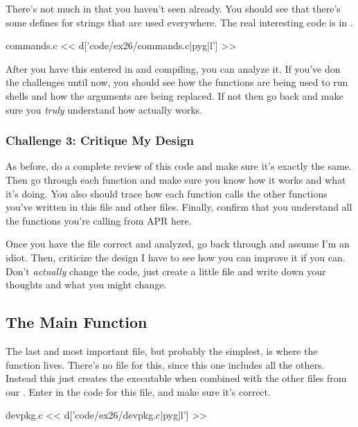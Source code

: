 There's not much in  that you haven't seen already.  You
should see that there's some defines for strings that are used everywhere.
The real interesting code is in .

\begin{code}{commands.c}
<< d['code/ex26/commands.c|pyg|l'] >>
\end{code}

After you have this entered in and compiling, you can analyze it.  If you've
don the challenges until now, you should see how the  functions
are being used to run shells and how the arguments are being replaced.  If
not then go back and make sure you \emph{truly} understand how 
actually works.

\subsubsection{Challenge 3: Critique My Design}

As before, do a complete review of this code and make sure it's exactly
the same.  Then go through each function and make sure you know how it 
works and what it's doing.  You also should trace how each function calls
the other functions you've written in this file and other files.  Finally,
confirm that you understand all the functions you're calling from APR here.

Once you have the file correct and analyzed, go back through and assume
I'm an idiot.  Then, criticize the design I have to see how you can improve
it if you can.  Don't \emph{actually} change the code, just create a little
 file and write down your thoughts and what you might change.


\subsection{The  Main Function}

The last and most important file, but probably the simplest, is 
where the  function lives.  There's no  file for this, since
this one includes all the others.  Instead this just creates the executable
 when combined with the other  files from our 
.  Enter in the code for this file, and make sure it's 
correct.

\begin{code}{devpkg.c}
<< d['code/ex26/devpkg.c|pyg|l'] >>
\end{code}

